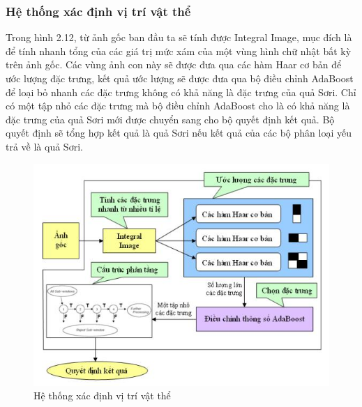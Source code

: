 \documentclass[12pt,a4paper]{article}
\begin{document}
\subsubsection{Hệ thống xác định vị trí vật thể}
Trong hình 2.12, từ ảnh gốc ban đầu ta sẽ tính được Integral Image, mục đích là để tính nhanh tổng của các giá trị mức xám của một vùng hình chữ nhật bất kỳ trên ảnh gốc. Các vùng ảnh con này sẽ được đưa qua các hàm Haar cơ bản để ước lượng đặc trưng, kết quả ước lượng sẽ được đưa qua bộ điều chỉnh AdaBoost để loại bỏ nhanh các đặc trưng không có khả năng là đặc trưng của quả Sơri. Chỉ có một tập nhỏ các đặc trưng mà bộ điều chỉnh AdaBoost cho là có khả năng là đặc trưng của quả Sơri mới được chuyển sang cho bộ quyết định kết quả. Bộ quyết định sẽ tổng hợp kết quả là quả Sơri nếu kết quả của các bộ phân loại yếu trả về là quả Sơri.
\begin{center}
    \begin{figure}[htp]
    \begin{center}
    \includegraphics[scale=.8]{Images/class}
    \end{center}
    \caption{Hệ thống xác định vị trí vật thể}
    \end{figure}
\end{center}
\newpage
\end{document}
